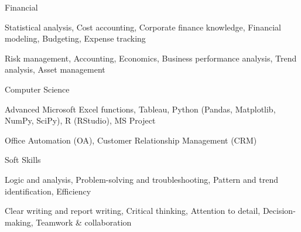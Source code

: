 \documentclass[11pt, a4paper]{awesome-cv}
\begin{document}
\begin{cvskills}

\cvskill
{Financial} %
{
  \begin{cvitems}
    \item {Statistical analysis, Cost accounting, Corporate finance knowledge, Financial modeling, Budgeting, Expense tracking}
    \item {Risk management, Accounting, Economics, Business performance analysis, Trend analysis, Asset management}
  \end{cvitems}
}

  \cvskill
    {Computer Science} %
    {
      \begin{cvitems} %
        \item {Advanced Microsoft Excel functions, Tableau, Python (Pandas, Matplotlib, NumPy, SciPy), R (RStudio), MS Project}
        \item {Office Automation (OA), Customer Relationship Management (CRM)}
      \end{cvitems}
    }

  \cvskill
    {Soft Skills} %
    {
      \begin{cvitems} %
        \item {Logic and analysis, Problem-solving and troubleshooting, Pattern and trend identification, Efficiency}
        \item {Clear writing and report writing, Critical thinking, Attention to detail, Decision-making,  Teamwork \& collaboration}
      \end{cvitems}
    }

\end{cvskills}

\end{document}
